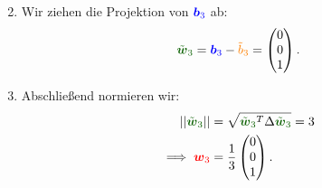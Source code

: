 \begin{Beispiel}
\begin{enumerate}
\begin{equation*}
    \end{equation*}
    \item Wir ziehen die Projektion von $\textcolor{blue}{{{\text{\boldmath${b}$}}}_3}$ ab:
    \begin{equation*}
        \textcolor{mygreen}{\Tilde{\wvec}_3}=\textcolor{blue}{\bvec_3}-\textcolor{orange}{\Tilde{b}_3}=\Matrix{0\\0\\1}.
    \end{equation*}
    \item Abschließend normieren wir:
    \begin{align*}
        \Norm{\textcolor{mygreen}{\Tilde{\wvec}_3}}&=\sqrt{\textcolor{mygreen}{\Tilde{\wvec}_3}^T\Delta \textcolor{mygreen}{\Tilde{\wvec}_3}}=3\\
    \implies \textcolor{red}{\wvec_3}&=\frac{1}{3}\Matrix{0\\0\\1}.
    \end{align*}
\end{enumerate}
\end{Beispiel}

